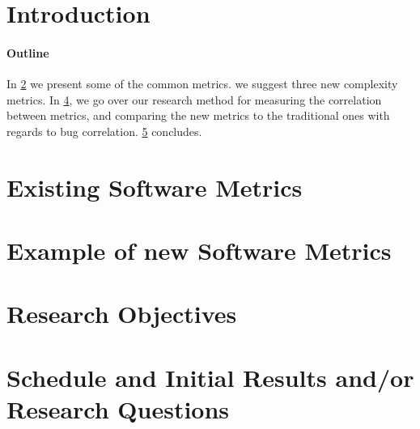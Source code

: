 \documentclass{article}                 %
\begin{document}
\maketitle

\begin{flushright}
  \begin{minipage}{2.5in}
    \normalsize \rmfamily\scshape
  \end{minipage}
\end{flushright}


\begin{abstract}
  
\end{abstract}

\section{Introduction}


\paragraph{Outline} 
In \cref{Section:metrics} we present some of the common metrics.
 we suggest three new complexity metrics.
In \cref{Section:objectives}, we go over our research method for measuring
the correlation between metrics, and comparing the new metrics to the
traditional ones with regards to bug correlation.
\cref{Section:zz} concludes. 

\section{Existing Software Metrics}
\label{Section:metrics}
%
\lipsum[1]

\section{Example of new Software Metrics}
\label{Section:new-metrics}
% 
\lipsum[2]

\section{Research Objectives}
\label{Section:objectives}
%
\lipsum[3]

\section{Schedule and Initial Results and/or Research Questions}
\label{Section:zz}




\end{document}
